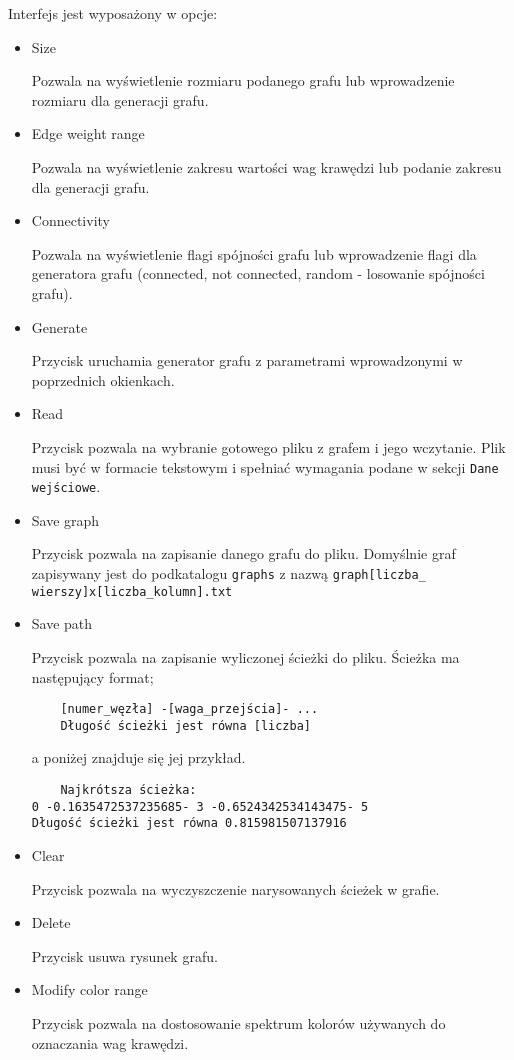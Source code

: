 \documentclass[]{article}
\begin{document}
Interfejs jest wyposażony w opcje:
\begin{itemize}
    \item Size
    
    Pozwala na wyświetlenie rozmiaru podanego grafu lub wprowadzenie rozmiaru dla generacji grafu.
    \item Edge weight range
    
    Pozwala na wyświetlenie zakresu wartości wag krawędzi lub podanie zakresu dla generacji grafu.
    
    \item Connectivity
    
    Pozwala na wyświetlenie flagi spójności grafu lub wprowadzenie flagi dla generatora grafu (connected, not connected, random - losowanie spójności grafu).
    \item Generate
    
    Przycisk uruchamia generator grafu z parametrami wprowadzonymi w poprzednich okienkach.
    \item Read
    
    Przycisk pozwala na wybranie gotowego pliku z grafem i jego wczytanie. Plik musi być w formacie tekstowym i spełniać wymagania podane w sekcji \texttt{Dane wejściowe}.
    \item Save graph
    
    Przycisk pozwala na zapisanie danego grafu do pliku. Domyślnie graf zapisywany jest do podkatalogu \texttt{graphs} z nazwą \texttt{graph[liczba\_ wierszy]x[liczba\_kolumn].txt}
    \item Save path
    
    Przycisk pozwala na zapisanie wyliczonej ścieżki do pliku. Ścieżka ma następujący format;
    \begin{verbatim}
    [numer_węzła] -[waga_przejścia]- ...
    Długość ścieżki jest równa [liczba]
    \end{verbatim}
    a poniżej znajduje się jej przykład.
    \begin{verbatim}
    Najkrótsza ścieżka:
0 -0.1635472537235685- 3 -0.6524342534143475- 5
Długość ścieżki jest równa 0.815981507137916
        \end{verbatim}

    \item Clear
    
    
    Przycisk pozwala na wyczyszczenie narysowanych ścieżek w grafie.
    \item Delete
    
    Przycisk usuwa rysunek grafu.
    \item Modify color range
    
    
    Przycisk pozwala na dostosowanie spektrum kolorów używanych do oznaczania wag krawędzi.
\end{itemize}
\end{document}
